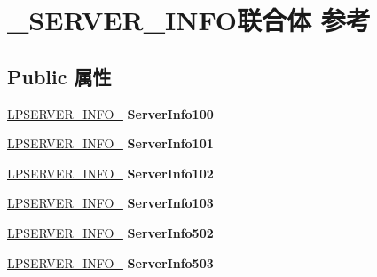 \hypertarget{union___s_e_r_v_e_r___i_n_f_o}{}\section{\+\_\+\+S\+E\+R\+V\+E\+R\+\_\+\+I\+N\+F\+O联合体 参考}
\label{union___s_e_r_v_e_r___i_n_f_o}
\subsection*{Public 属性}
\begin{DoxyCompactItemize}
\item 
\mbox{\label{union___s_e_r_v_e_r___i_n_f_o_a9de63353b59afb47fdbe7c99b7757280}} 
\hyperlink{struct___s_e_r_v_e_r___i_n_f_o__100}{L\+P\+S\+E\+R\+V\+E\+R\+\_\+\+I\+N\+F\+O\+\_} {\bfseries Server\+Info100}
\item 
\mbox{\label{union___s_e_r_v_e_r___i_n_f_o_a639c6a8bb3ff52c4967af0a26cd8bebf}} 
\hyperlink{struct___s_e_r_v_e_r___i_n_f_o__101}{L\+P\+S\+E\+R\+V\+E\+R\+\_\+\+I\+N\+F\+O\+\_} {\bfseries Server\+Info101}
\item 
\mbox{\label{union___s_e_r_v_e_r___i_n_f_o_a1ab58c8373c7d7af18fbea3f1150ee65}} 
\hyperlink{struct___s_e_r_v_e_r___i_n_f_o__102}{L\+P\+S\+E\+R\+V\+E\+R\+\_\+\+I\+N\+F\+O\+\_} {\bfseries Server\+Info102}
\item 
\mbox{\label{union___s_e_r_v_e_r___i_n_f_o_a6528650fc2973bf837e4c36c45bc41cc}} 
\hyperlink{struct___s_e_r_v_e_r___i_n_f_o__103}{L\+P\+S\+E\+R\+V\+E\+R\+\_\+\+I\+N\+F\+O\+\_} {\bfseries Server\+Info103}
\item 
\mbox{\label{union___s_e_r_v_e_r___i_n_f_o_aa6fcfdf0bd2fdcbc617aa98fba69fb6f}} 
\hyperlink{struct___s_e_r_v_e_r___i_n_f_o__502}{L\+P\+S\+E\+R\+V\+E\+R\+\_\+\+I\+N\+F\+O\+\_} {\bfseries Server\+Info502}
\item 
\mbox{\label{union___s_e_r_v_e_r___i_n_f_o_a54796661750463d0eb53522741e2bb9c}} 
\hyperlink{struct___s_e_r_v_e_r___i_n_f_o__503}{L\+P\+S\+E\+R\+V\+E\+R\+\_\+\+I\+N\+F\+O\+\_} {\bfseries Server\+Info503}

\end{DoxyCompactItemize}
